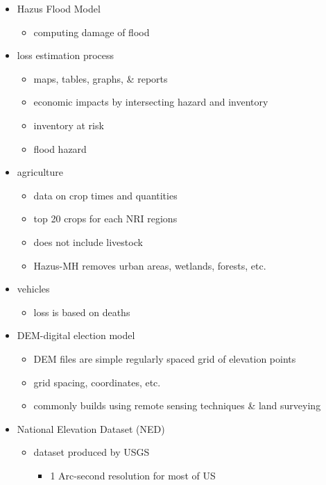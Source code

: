 \documentclass[11pt ,twoside, a4paper]{article}
\begin{document}
\begin{itemize}
	\item Hazus Flood Model
	\begin{itemize}
		\item computing damage of flood 
	\end{itemize}
	
	\item loss estimation process
	\begin{itemize}
		\item maps, tables, graphs, \& reports
		\item economic impacts by intersecting hazard and inventory
		\item inventory at risk
		\item flood hazard
	\end{itemize}
	
	\item agriculture
	\begin{itemize}
		\item data on crop times and quantities
		\item top 20 crops for each NRI regions
		\item does not include livestock
		\item Hazus-MH removes urban areas, wetlands, forests, etc.
	\end{itemize}
	
	\item vehicles
	\begin{itemize}
		\item loss is based on deaths
	\end{itemize}
	
	\item DEM-digital election model
	\begin{itemize}
		\item DEM files are simple regularly spaced grid of elevation points
		\item grid spacing, coordinates, etc.
		\item commonly builds using remote sensing techniques \& land surveying 
	\end{itemize}
	
	\item National Elevation Dataset (NED)
	\begin{itemize}
		\item dataset produced by USGS 
		\begin{itemize}
			\item 1 Arc-second resolution for most of US
		\end{itemize}
	\end{itemize}
	

\end{itemize}
\end{document}
